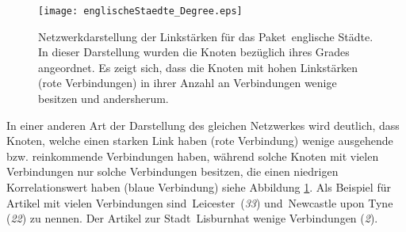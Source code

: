 \documentclass[fontsize=11pt, twoside, a4paper]{scrartcl}
\begin{document}
\begin{figure}[H]
	\centering
	\texttt{[image: englischeStaedte\_Degree.eps]}
	\label{englischeStaedte_Degree}
	\caption{Netzwerkdarstellung der Linkstärken für das Paket \,\glqq englische Städte\grqq. In dieser Darstellung wurden die Knoten bezüglich ihres Grades angeordnet. Es zeigt sich, dass die Knoten mit hohen Linkstärken (rote Verbindungen) in ihrer Anzahl an Verbindungen wenige besitzen und andersherum.}
\end{figure}
In einer anderen Art der Darstellung des gleichen Netzwerkes wird deutlich, dass Knoten, welche einen starken Link haben (rote Verbindung) wenige ausgehende bzw. reinkommende Verbindungen haben, während solche Knoten mit vielen Verbindungen nur solche Verbindungen besitzen, die einen niedrigen Korrelationswert haben (blaue Verbindung) siehe Abbildung \ref{englischeStaedte_Degree}. Als Beispiel für Artikel mit vielen Verbindungen sind \,\glqq Leicester\grqq\, (\textit{33}) und \,\glqq Newcastle upon Tyne\grqq \,(\textit{22}) zu nennen. Der Artikel zur Stadt \,\glqq Lisburn\grqq hat wenige Verbindungen (\textit{2}).
\end{document}
